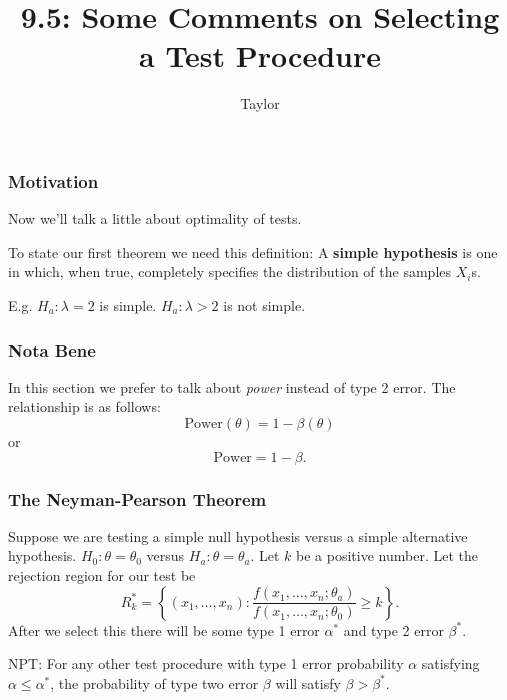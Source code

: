 \documentclass{beamer}
\title["9.5"]{9.5: Some Comments on Selecting a Test Procedure}
\author{Taylor}
\institute[UVA] 
{
University of Virginia \\
\medskip
\textit{} 
}
\date{}
\begin{document}

\begin{frame}
\titlepage 
\end{frame}

\begin{frame}
\frametitle{Motivation}

Now we'll talk a little about optimality of tests.
\newline

To state our first theorem we need this definition:
A \textbf{simple hypothesis} is one in which, when true, completely specifies the distribution of the samples $X_i$s.
\newline

E.g. $H_a: \lambda = 2$ is simple. $H_a: \lambda > 2$ is not simple.

\end{frame}

\begin{frame}
\frametitle{Nota Bene}

In this section we prefer to talk about \emph{power} instead of type 2 error. The relationship is as follows:
\[
\text{Power}(\theta) = 1- \beta(\theta)
\]
or
\[
\text{Power} = 1 - \beta. 
\]

\end{frame}


\begin{frame}
\frametitle{The Neyman-Pearson Theorem}

Suppose we are testing a simple null hypothesis versus a simple alternative hypothesis. $H_0: \theta = \theta_0$ versus $H_a: \theta = \theta_a$. Let $k$ be a positive number. Let the rejection region for our test be
\[
R^*_k = \left\{(x_1, \ldots, x_n) : \frac{f(x_1, \ldots, x_n ; \theta_a)}{f(x_1, \ldots, x_n ; \theta_0)}  \ge k \right\}.
\]
After we select this there will be some type 1 error $\alpha^*$ and type 2 error $\beta^*$.
\newline

\begin{theorem}
NPT: For any other test procedure with type 1 error probability $\alpha$ satisfying $\alpha \le \alpha^*$, the probability of type two error $\beta$ will satisfy $\beta > \beta^*$.
\end{theorem}
\end{frame}
\end{document}
